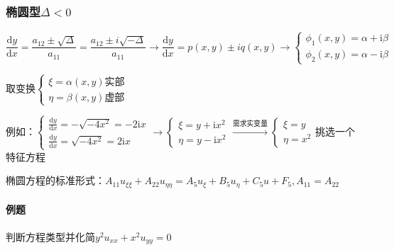 \subsubsection{椭圆型\(\Delta<0\)}
\[
\frac{\mathrm{d}y}{\mathrm{d}x}=\frac{a_{12}\pm\sqrt\Delta}{a_{11}}=\frac{a_{12}\pm i\sqrt{-\Delta}}{a_{11}}\rightarrow\frac{\mathrm{d}y}{\mathrm{d}x}=p(x,y)\pm iq(x,y)\rightarrow\begin{cases}\phi_1(x,y)=\alpha+\mathrm{i}\beta\\\phi_2(x,y)=\alpha-\mathrm{i}\beta\end{cases}
\]

取变换\(\begin{cases}\xi=\alpha(x,y)\text{实部}\\\eta=\beta(x,y)\text{虚部}\end{cases}\)

例如：\(\begin{cases}\frac{\mathrm{d}y}{\mathrm{d}x}=-\sqrt{-4x^2}=-2\mathrm{i}x\\\frac{\mathrm{d}y}{\mathrm{d}x}=\sqrt{-4x^2}=2\mathrm{i}x\end{cases}\rightarrow\begin{cases}\xi=y+\mathrm{i}x^2\\\eta=y-\mathrm{i}x^2\end{cases}\xrightarrow{\text{需求实变量}}\begin{cases}\xi=y\\\eta=x^2\end{cases}\)挑选一个特征方程

椭圆方程的标准形式：\(A_{11}u_{\xi\xi}+A_{22}u_{\eta\eta}=A_5u_\xi+B_5u_\eta+C_5u+F_5,A_{11}=A_{22}\)

\paragraph{例题}判断方程类型并化简\(y^2u_{xx}+x^2u_{yy}=0\)